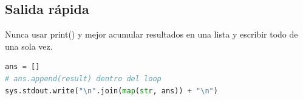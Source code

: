 \subsection{Salida rápida}
\label{alg:1-5}

Nunca usar print() y mejor acumular resultados en una lista y escribir todo de una sola vez.

\begin{lstlisting}[language=Python]
ans = []
# ans.append(result) dentro del loop
sys.stdout.write("\n".join(map(str, ans)) + "\n")
\end{lstlisting}
